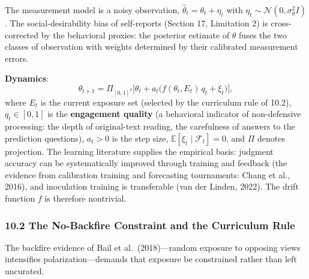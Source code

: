 \documentclass[
  11pt]{article}
\begin{document}
The measurement model is a noisy observation,
\(\hat\theta_t = \theta_t + \eta_t\) with
\(\eta_t \sim \mathcal{N}(0, \sigma_\theta^2 I)\). The
social-desirability bias of self-reports (Section 17, Limitation 2) is
cross-corrected by the behavioral proxies: the posterior estimate of
\(\theta\) fuses the two classes of observation with weights determined
by their calibrated measurement errors.

\textbf{Dynamics}:
\[\theta_{t+1} = \Pi_{[0,1]^3}\Big[\theta_t + a_t\big(f(\theta_t, E_t)\, q_t + \xi_t\big)\Big],\]
where \(E_t\) is the current exposure set (selected by the curriculum
rule of 10.2), \(q_t \in [0,1]\) is the \textbf{engagement quality} (a
behavioral indicator of non-defensive processing: the depth of
original-text reading, the carefulness of answers to the prediction
questions), \(a_t > 0\) is the step size,
\(\mathbb{E}[\xi_t \mid \mathcal{F}_t] = 0\), and \(\Pi\) denotes
projection. The learning literature supplies the empirical basis:
judgment accuracy can be systematically improved through training and
feedback (the evidence from calibration training and forecasting
tournaments: Chang et al., 2016), and inoculation training is
transferable (van der Linden, 2022). The drift function \(f\) is
therefore nontrivial.

\subsubsection{10.2 The No-Backfire Constraint and the Curriculum
Rule}\label{the-no-backfire-constraint-and-the-curriculum-rule}

The backfire evidence of Bail et al.~(2018)---random exposure to
opposing views intensifies polarization---demands that exposure be
constrained rather than left uncurated.
\end{document}
